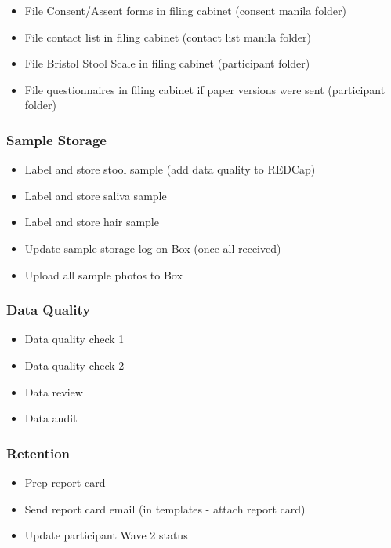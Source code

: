 \documentclass[]{book}
\providecommand{\tightlist}{%
  \setlength{\itemsep}{0pt}\setlength{\parskip}{0pt}}
\begin{document}
\begin{itemize}
\tightlist
\item
  File Consent/Assent forms in filing cabinet (consent manila folder)
\item
  File contact list in filing cabinet (contact list manila folder)
\item
  File Bristol Stool Scale in filing cabinet (participant folder)
\item
  File questionnaires in filing cabinet if paper versions were sent (participant folder)
\end{itemize}

\hypertarget{sample-storage}{%
\subsubsection{Sample Storage}\label{sample-storage}}

\begin{itemize}
\tightlist
\item
  Label and store stool sample (add data quality to REDCap)
\item
  Label and store saliva sample
\item
  Label and store hair sample
\item
  Update sample storage log on Box (once all received)
\item
  Upload all sample photos to Box
\end{itemize}

\hypertarget{data-quality}{%
\subsubsection{Data Quality}\label{data-quality}}

\begin{itemize}
\tightlist
\item
  Data quality check 1
\item
  Data quality check 2
\item
  Data review
\item
  Data audit
\end{itemize}

\hypertarget{retention}{%
\subsubsection{Retention}\label{retention}}

\begin{itemize}
\tightlist
\item
  Prep report card
\item
  Send report card email (in templates - attach report card)
\item
  Update participant Wave 2 status
\end{itemize}
\end{document}
